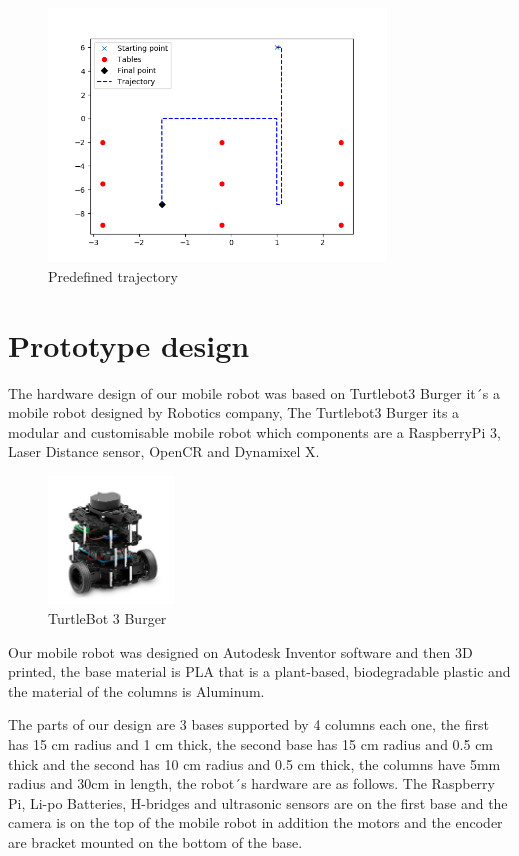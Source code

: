 \begin{figure}[h!]
    \centering
 	\includegraphics[trim=0 0 0 0,clip,width=0.8\textwidth]{Figs/Trajectory1.png}
    \caption{Predefined trajectory}
    \label{fig:Cords_Tables}
\end{figure}


\newpage
\section{Prototype design}
The hardware design of our mobile robot was based on Turtlebot3 Burger  it´s a mobile robot designed by Robotics company, The Turtlebot3 Burger its a modular and customisable mobile robot which components are a RaspberryPi 3, Laser Distance sensor, OpenCR and Dynamixel X.

\begin{figure}[h!]
    \centering
 	\includegraphics[trim=0 0 0 0,clip,width=0.3\textwidth]{Figs/Burger.png}
    \caption{TurtleBot 3 Burger}
    \label{fig:Burger}
\end{figure}

Our mobile robot was designed on Autodesk Inventor software and then 3D printed, the base material is PLA that is a plant-based, biodegradable plastic and the material of the columns is Aluminum.

The parts of our design are 3 bases supported by 4 columns each one, the first has 15 cm radius and 1 cm thick, the second base has 15 cm radius and 0.5 cm thick and the second has 10 cm radius and 0.5 cm thick, the columns have 5mm radius and 30cm in length, the robot´s hardware are as follows. The Raspberry Pi, Li-po Batteries, H-bridges and ultrasonic sensors are on the first base and the camera is on the top of the mobile robot in addition the motors and the encoder are bracket mounted on the bottom of the base.    

